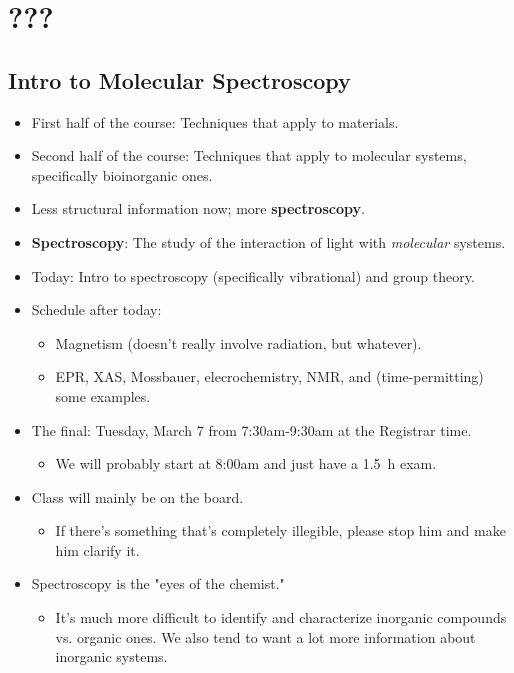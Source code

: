 \documentclass[../notes.tex]{subfiles}
\begin{document}
\chapter{???}
\section{Intro to Molecular Spectroscopy}
\begin{itemize}
    \item {}First half of the course: Techniques that apply to materials.
    \item Second half of the course: Techniques that apply to molecular systems, specifically bioinorganic ones.
    \item Less structural information now; more \textbf{spectroscopy}.
    \item \textbf{Spectroscopy}: The study of the interaction of light with \emph{molecular} systems.
    \item Today: Intro to spectroscopy (specifically vibrational) and group theory.
    \item Schedule after today:
    \begin{itemize}
        \item Magnetism (doesn't really involve radiation, but whatever).
        \item EPR, XAS, Mossbauer, elecrochemistry, NMR, and (time-permitting) some examples.
    \end{itemize}
    \item The final: Tuesday, March 7 from 7:30am-9:30am at the Registrar time.
    \begin{itemize}
        \item We will probably start at 8:00am and just have a \SI{1.5}{\hour} exam.
    \end{itemize}
    \item Class will mainly be on the board.
    \begin{itemize}
        \item If there's something that's completely illegible, please stop him and make him clarify it.
    \end{itemize}
    \item Spectroscopy is the "eyes of the chemist."
    \begin{itemize}
        \item It's much more difficult to identify and characterize inorganic compounds vs. organic ones. We also tend to want a lot more information about inorganic systems.

\end{itemize}
\end{itemize}
\end{document}
